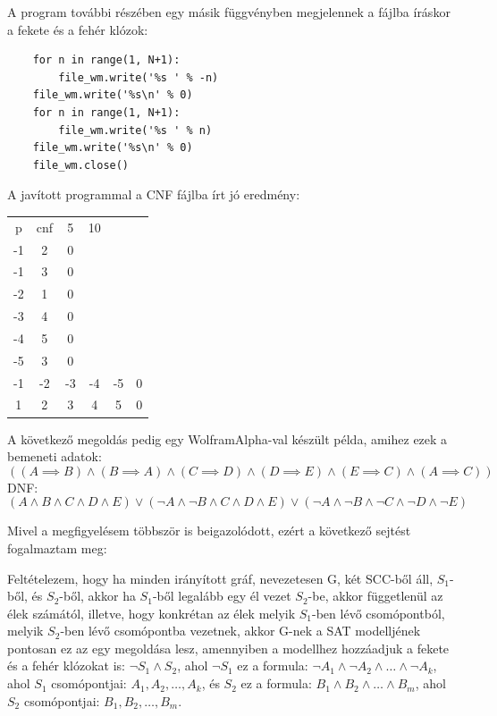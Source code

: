 \documentclass[
]{thesis-ekf}
\theoremstyle{definition}
\theoremstyle{remark}
\begin{document}
A program további részében egy másik függvényben megjelennek a fájlba íráskor a fekete és a fehér klózok:
	\begin{lstlisting}
	for n in range(1, N+1):
		file_wm.write('%s ' % -n)
	file_wm.write('%s\n' % 0)
	for n in range(1, N+1):
		file_wm.write('%s ' % n)
	file_wm.write('%s\n' % 0)
	file_wm.close()
	\end{lstlisting}	
	
	A javított programmal a \textsc{CNF} fájlba írt jó eredmény:

	\begin{tabular}{cccccc}
		p & cnf & 5 & 10 & &   \\
		-1&  2 &  0&   &   &   \\
		-1&  3 &  0&   &   &   \\
		-2&  1 &  0&   &   &   \\
		-3&  4 &  0&   &   &   \\
		-4&  5 &  0&   &   &   \\
		-5&  3 &  0&   &   &   \\
		-1& -2 & -3& -4& -5& 0 \\
		1&  2 &  3&  4&  5& 0 \\
	\end{tabular}

	A következő megoldás pedig egy WolframAlpha-val készült példa, amihez ezek a bemeneti adatok:
	\[ ((A\implies B)\wedge(B\implies A)\wedge(C\implies D)\wedge(D\implies E)\wedge(E\implies C)\wedge(A\implies C)) \]
	\textsc{DNF}:
	\[ (A\wedge B\wedge C\wedge D\wedge E)\vee (\neg A\wedge\neg B\wedge C\wedge D\wedge E)\vee (\neg A\wedge\neg B\wedge\neg C\wedge\neg D\wedge\neg E) \]
	
	Mivel a megfigyelésem többször is beigazolódott, ezért a következő sejtést fogalmaztam meg:
	
	Feltételezem, hogy ha minden irányított gráf, nevezetesen G, két \textsc{SCC}-ből áll, $ S_1 $-ből, és $ S_2 $-ből, akkor ha $ S_1 $-ből legalább egy él vezet $ S_2 $-be, akkor függetlenül az élek számától, illetve, hogy konkrétan az élek melyik $ S_1 $-ben lévő csomópontból, melyik $ S_2 $-ben lévő csomópontba vezetnek, akkor G-nek a \textsc{SAT} modelljének pontosan ez az egy megoldása lesz, amennyiben a modellhez hozzáadjuk a fekete és a fehér klózokat is: $ \neg S_1\wedge S_2 $, ahol $ \neg S_1 $ ez a formula: $\neg A_1 \wedge \neg A_2\wedge\dots\wedge\neg A_k$, ahol $ S_1 $ csomópontjai: $ A_1,A_2,\dots,A_k $, és $ S_2 $ ez a formula: $ B_1\wedge B_2\wedge\dots\wedge B_m $, ahol $ S_2 $ csomópontjai: $ B_1,B_2,\dots,B_m $.
	
\end{document}

